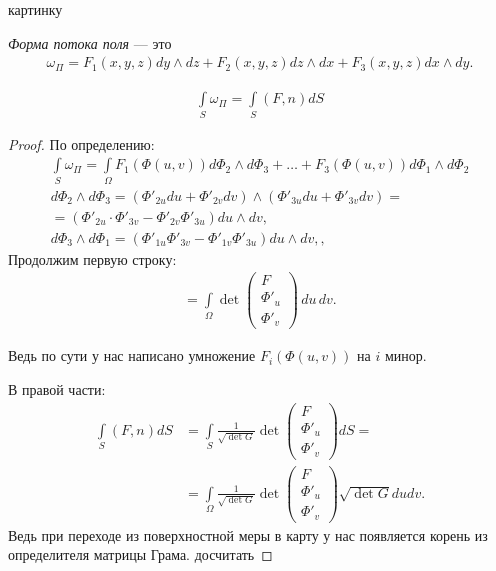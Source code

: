 {\color{red} картинку}

\begin{df}
 \textit{Форма потока поля} --- это
 \begin{align*}
  \omega_{\Pi} = F_1(x,y,z) dy \land dz + F_2(x,y,z) dz \land dx + F_3(x,y,z) dx \land dy
 .\end{align*} 
\end{df}
\begin{claim}
 \begin{align*}
  \int\limits_{S} \omega_{\Pi} = \int\limits_{S} (F, n) dS
 \end{align*} 
\end{claim}
\begin{proof}
 По определению:
 \begin{align*}
  \int\limits_{S} \omega_{\Pi} = \int\limits_{\Omega} F_1(\Phi(u,v)) d\Phi_2 \land d\Phi_3 + \ldots + F_3(\Phi(u, v)) d \Phi_1 \land d\Phi_2\\
  d\Phi_2 \land d\Phi_3 = (\Phi'_{2u} du + \Phi'_{2v} dv) \land (\Phi'_{3u} du + \Phi'_{3v} dv) = \\
  = \left( \Phi'_{2u} \cdot \Phi'_{3v} - \Phi'_{2v} \Phi'_{3u} \right) du \land dv, \\
  d\Phi_3 \land d\Phi_1 = \left( \Phi'_{1u} \Phi'_{3v} - \Phi'_{1v}\Phi'_{3u} \right) du \land dv,
 ,\end{align*} Продолжим первую строку:
 \begin{align*}
  = \int\limits_{\Omega} \det \begin{pmatrix}
   F \\
   \Phi'_u \\
   \Phi'_v
  \end{pmatrix} \, du \, dv
 .\end{align*} 

 Ведь по сути у нас написано умножение $F_i(\Phi(u, v))$ на $i$ минор.


 В правой части:
 \begin{align*}
  \int\limits_{S} (F, n) dS &= \int\limits_S \frac{1}{\sqrt{\det G} } \det \begin{pmatrix}
   F \\
   \Phi'_u \\
   \Phi'_v
  \end{pmatrix} dS = \\
  &= \int\limits_\Omega \frac{1}{\sqrt { \det G }} \det \begin{pmatrix}
   F \\
   \Phi'_u \\
   \Phi'_v
  \end{pmatrix} \sqrt{\det G} du dv
 .\end{align*} 
 Ведь при переходе из поверхностной меры в карту у нас появляется корень из определителя матрицы Грама.
 {\color{red} досчитать}
\end{proof}

